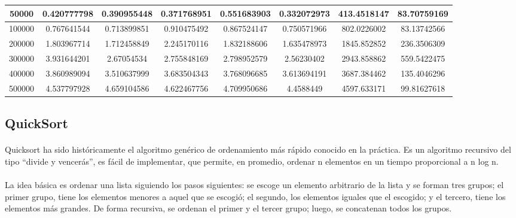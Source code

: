 \documentclass{article}
\begin{document}
\begin{table}[]
\begin{tabular}{|c|c|c|c|c|c|c|c| }
50000 &	0.420777798 &	0.390955448 &	0.371768951 &	0.551683903 &	0.332072973	 &413.4518147	 &83.70759169\\ \hline
100000 &	0.767641544	 &0.713899851 &	0.910475492 &	0.867524147 &	0.750571966 &	802.0226002	 &83.13742566\\ \hline
200000 &	1.803967714 &	1.712458849 &	2.245170116 &	1.832188606 &	1.635478973	 &1845.852852 &	236.3506309\\ \hline
300000 &	3.931644201 &	2.67054534 &	2.755848169 &	2.798952579 &	2.56230402	 &2943.858862	 &559.5422475\\ \hline
400000 &	3.860989094 &	3.510637999 &	3.683504343 &	3.768096685 &	3.613694191	 &3687.384462	 &135.4046296\\ \hline
500000 &	4.537797928 &	4.659104586 &	4.622467756 &	4.709950686 &	4.4588449	 &4597.633171 &99.81627618\\ \hline


            \end{tabular}
    \end{table}
    \subsection{QuickSort}
        \paragraph {}
        Quicksort ha sido históricamente el algoritmo genérico de ordenamiento más rápido conocido en la práctica. Es un algoritmo recursivo del tipo “divide y vencerás”, es fácil de implementar, que permite, en promedio, ordenar n elementos en un tiempo proporcional a n log n.
        \paragraph {}
        La idea básica es ordenar una lista siguiendo los pasos siguientes: se escoge un elemento arbitrario de la lista y se forman tres grupos; el primer grupo, tiene los elementos menores a aquel que se escogió; el segundo, los elementos iguales que el escogido; y el tercero, tiene los elementos más grandes. De forma recursiva, se ordenan el primer y el tercer grupo; luego, se concatenan todos los grupos.
\end{document}
